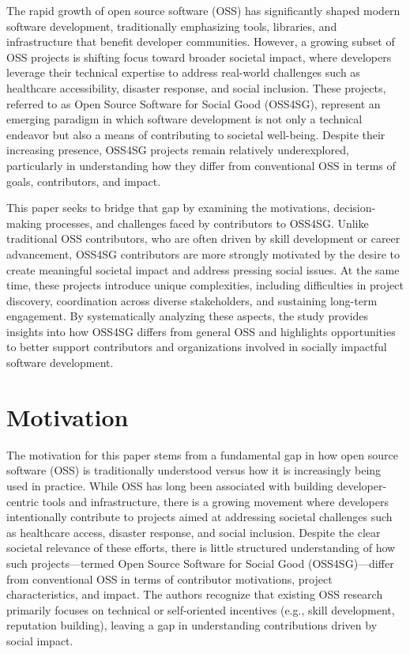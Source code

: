 The rapid growth of open source software (OSS) has significantly shaped modern software development, traditionally emphasizing tools, libraries, and infrastructure that benefit developer communities. However, a growing subset of OSS projects is shifting focus toward broader societal impact, where developers leverage their technical expertise to address real-world challenges such as healthcare accessibility, disaster response, and social inclusion. These projects, referred to as Open Source Software for Social Good (OSS4SG), represent an emerging paradigm in which software development is not only a technical endeavor but also a means of contributing to societal well-being. Despite their increasing presence, OSS4SG projects remain relatively underexplored, particularly in understanding how they differ from conventional OSS in terms of goals, contributors, and impact.

This paper seeks to bridge that gap by examining the motivations, decision-making processes, and challenges faced by contributors to OSS4SG. Unlike traditional OSS contributors, who are often driven by skill development or career advancement, OSS4SG contributors are more strongly motivated by the desire to create meaningful societal impact and address pressing social issues. At the same time, these projects introduce unique complexities, including difficulties in project discovery, coordination across diverse stakeholders, and sustaining long-term engagement. By systematically analyzing these aspects, the study provides insights into how OSS4SG differs from general OSS and highlights opportunities to better support contributors and organizations involved in socially impactful software development.

\section{Motivation}
The motivation for this paper stems from a fundamental gap in how open source software (OSS) is traditionally understood versus how it is increasingly being used in practice. While OSS has long been associated with building developer-centric tools and infrastructure, there is a growing movement where developers intentionally contribute to projects aimed at addressing societal challenges such as healthcare access, disaster response, and social inclusion. Despite the clear societal relevance of these efforts, there is little structured understanding of how such projects—termed Open Source Software for Social Good (OSS4SG)—differ from conventional OSS in terms of contributor motivations, project characteristics, and impact. The authors recognize that existing OSS research primarily focuses on technical or self-oriented incentives (e.g., skill development, reputation building), leaving a gap in understanding contributions driven by social impact.

